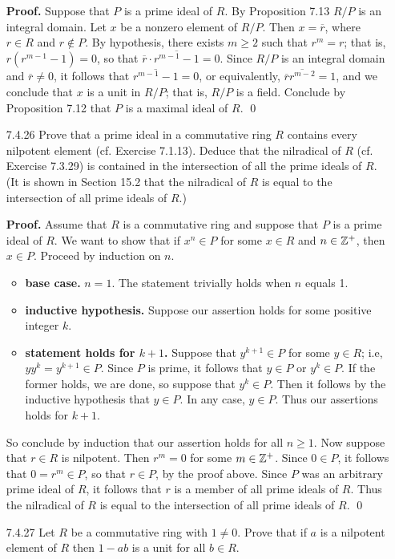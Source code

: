 \begin{enumerate}
      \textbf{Proof.} Suppose that $P$ is a prime ideal of $R$. By Proposition
      7.13 $R/P$ is an integral domain. Let $x$ be a nonzero element of $R/P$.
      Then $x = \overline{r}$, where $r \in R$ and $r \notin P$. By hypothesis,
      there exists $m \ge 2$ such that $r^m = r$; that is, $r(r^{m-1}-1) = 0$,
      so that $\overline{r} \cdot \overline{r^{m-1}-1} = 0$. Since $R/P$ is an
      integral domain and $\overline{r} \neq 0$, it follows that
      $\overline{r^{m-1}-1} = 0$, or equivalently,
      $\overline{r}\overline{r^{m-2}} = 1$, and we conclude that $x$ is a unit
      in $R/P$; that is, $R/P$ is a field. Conclude by Proposition 7.12 that
      $P$ is a maximal ideal of $R$. \qed
   \item[7.4.26]  Prove that a prime ideal in a commutative ring $R$ contains
                  every nilpotent element (cf. Exercise 7.1.13). Deduce that the
                  nilradical of $R$ (cf. Exercise 7.3.29) is contained in the
                  intersection of all the prime ideals of $R$. (It is shown in
                  Section 15.2 that the nilradical of $R$ is equal to the
                  intersection of all prime ideals of $R$.)

      \textbf{Proof.} Assume that $R$ is a commutative ring and suppose that $P$
      is a prime ideal of $R$. We want to show that if $x^n \in P$ for some
      $x \in R$ and $n \in \mathbb{Z}^+$, then $x \in P$. Proceed by induction on $n$.
   
      \begin{itemize}
         \item \textbf{base case.} $n = 1$. The statement trivially holds when
               $n$ equals 1.
         \item \textbf{inductive hypothesis.} Suppose our assertion holds for
               some positive integer $k$.
         \item \textbf{statement holds for $k+1$.} Suppose that $y^{k+1} \in P$
               for some $y \in R$; i.e, $yy^k = y^{k+1} \in P$. Since $P$ is
               prime, it follows that $y \in P$ or $y^k \in P$. If the former
               holds, we are done, so suppose that $y^k \in P$. Then it follows
               by the inductive hypothesis that $y \in P$. In any case,
               $y \in P$. Thus our assertions holds for $k + 1$.
      \end{itemize}
      So conclude by induction that our assertion holds for all $n \ge 1$. Now
      suppose that $r \in R$ is nilpotent. Then $r^m = 0$ for some $m \in \mathbb{Z}^+$.
      Since $0 \in P$, it follows that $0 = r^m \in P$, so that $r \in P$, by
      the proof above. Since $P$ was an arbitrary prime ideal of $R$, it follows
      that $r$ is a member of all prime ideals of $R$. Thus the nilradical of
      $R$ is equal to the intersection of all prime ideals of $R$. \qed
   \item[7.4.27]  Let $R$ be a commutative ring with $1 \neq 0$. Prove that if
                  $a$ is a nilpotent element of $R$ then $1 - ab$ is a unit for
                  all $b \in R$.


\end{enumerate}
